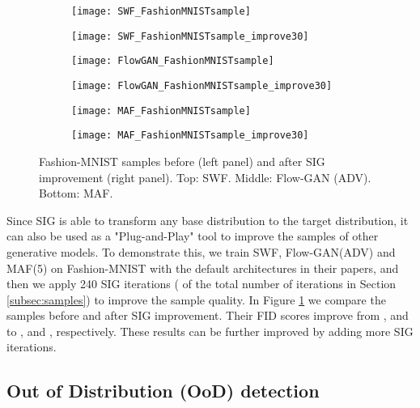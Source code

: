 \documentclass{article}
\begin{document}
\label{subsec:improve}



\begin{figure}
     \centering
     \begin{subfigure}[]{0.495\linewidth}
         \centering \texttt{[image: SWF\_FashionMNISTsample]}
     \end{subfigure}
     \hfill
     \begin{subfigure}[]{0.495\linewidth}
         \centering \texttt{[image: SWF\_FashionMNISTsample\_improve30]}
     \end{subfigure}
     \hfill
     \begin{subfigure}[]{0.495\linewidth}
         \centering \texttt{[image: FlowGAN\_FashionMNISTsample]}
     \end{subfigure}
     \hfill
     \begin{subfigure}[]{0.495\linewidth}
         \centering \texttt{[image: FlowGAN\_FashionMNISTsample\_improve30]}
     \end{subfigure}
     \hfill
     \begin{subfigure}[]{0.495\linewidth}
         \centering \texttt{[image: MAF\_FashionMNISTsample]}
     \end{subfigure}
     \hfill
     \begin{subfigure}[]{0.495\linewidth}
         \centering \texttt{[image: MAF\_FashionMNISTsample\_improve30]}
     \end{subfigure}
    \caption{Fashion-MNIST samples before (left panel) and after SIG improvement (right panel). Top: SWF. Middle: Flow-GAN (ADV). Bottom: MAF.}
    \label{fig:improve}
    \vskip -0.15in
\end{figure}

Since SIG is able to transform any base distribution to the target distribution, it can also be used as a "Plug-and-Play" tool to improve the samples of other generative models. To demonstrate this, we train SWF, Flow-GAN(ADV) and MAF(5) on Fashion-MNIST with the default architectures in their papers, and then we apply 240 SIG iterations ( of the total number of iterations in Section \ref{subsec:samples}) to improve the sample quality. In Figure \ref{fig:improve} we compare the samples before and after SIG improvement. Their FID scores improve from ,  and  to ,  and , respectively. These results can be further improved by adding more SIG iterations.


\subsection{Out of Distribution (OoD) detection}
\end{document}
